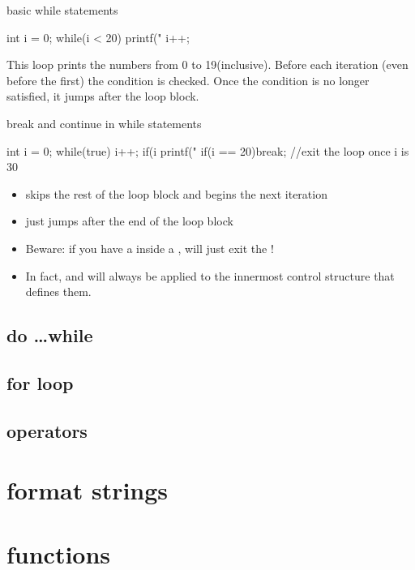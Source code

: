 \documentclass[10pt,graphics,aspectratio=169,table]{beamer}
\begin{document}
\begin{frame}[fragile]{basic while statements}
    \begin{codeblock}
int i = 0;
while(i < 20){
    printf("%
    i++;
}
    \end{codeblock}

    This loop prints the numbers from 0 to 19(inclusive).
    Before each iteration (even before the first) the condition is checked.
    Once the condition is no longer satisfied, it jumps after the loop block.
\end{frame}
\begin{frame}[fragile]{break and continue in while statements}
    \begin{codeblock}
int i = 0;
while(true){
    i++; 
    if(i %
    printf("%
    if(i == 20)break; //exit the loop once i is 30
}
    \end{codeblock} 
    \begin{itemize}
        \item
             skips the rest of the loop block and begins
            the next iteration
        \item {} just jumps after the end of the loop block
        \item 
            Beware: if you have a  inside a ,
             will just exit the !
        \item 
            In fact,  and  will always be applied to
            the innermost control structure that defines them. 
    \end{itemize}
\end{frame}

\subsection{do \ldots while}

\subsection{for loop}

\subsection{operators}

\section{format strings}

\section{functions}
\end{document}
